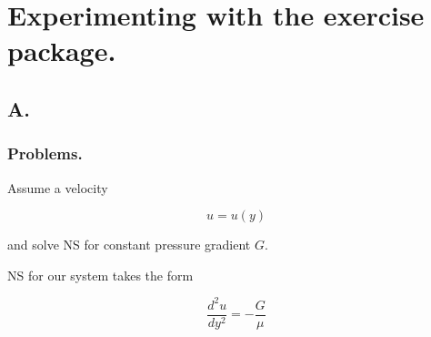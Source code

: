 


\usepackage[answerdelayed]{exercise}
\chapter{Experimenting with the exercise package.}

\label{chap:template}
\date{May 10, 2012}
\keywords{}

\beginArtNoToc

\section{A.}

\subsection{Problems.}

\begin{Exercise}[title={Euler's constant}, difficulty=2, label=ex1,
origin={P.Paelw}]
\end{Exercise}

\begin{Exercise}[title={1d fluid flow}, label={problem:ps1q1},
origin={P.Paelw}]

Assume a velocity 

\begin{equation}\label{eqn:fourierSeries:10}
u = u(y)
\end{equation}

and solve NS for constant pressure gradient $G$.

\end{Exercise}

\begin{Answer}[ref={problem:ps1q1}]

NS for our system takes the form

\begin{equation}\label{eqn:fourierSeries:30}
\frac{d^2 u}{dy^2} = -\frac{G}{\mu}
\end{equation}

\end{Answer}

